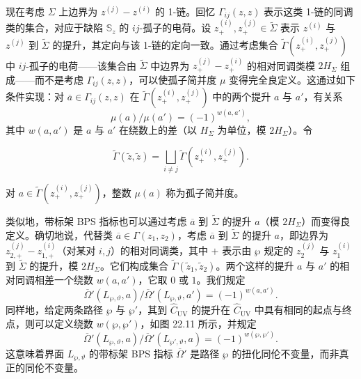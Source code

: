 现在考虑 $\Sigma$ 上边界为 $z^{(j)}-z^{(i)}$ 的 1-链。回忆 $\Gamma_{ij}(z,z)$ 表示这类 1-链的同调类的集合，对应于缺陷 $\mathbb{S}_z$ 的 $ij$-孤子的电荷。设 $z_+^{(i)},z_+^{(j)}\in\widetilde{\Sigma}$ 表示 $z^{(i)}$ 与 $z^{(j)}$ 到 $\widetilde{\Sigma}$ 的提升，其定向与该 1-链的定向一致。通过考虑集合 $\widetilde{\Gamma}(z_+^{(i)},z_+^{(j)})$ 中 $ij$-孤子的电荷——该集合由 $\widetilde{\Sigma}$ 中边界为 $z_+^{(j)}-z_+^{(i)}$ 的相对同调类模 $2H_\Sigma$ 组成——而不是考虑 $\Gamma_{ij}(z,z)$，可以使孤子简并度 $\mu$ 变得完全良定义。这通过如下条件实现：对 $\overline{a}\in\Gamma_{ij}(z,z)$ 在 $\widetilde{\Gamma}(z_+^{(i)},z_+^{(j)})$ 中的两个提升 $a$ 与 $a'$，有关系
\[
\mu(a)/\mu(a')=(-1)^{w(a,a')},
\]
其中 $w(a,a')$ 是 $a$ 与 $a'$ 在绕数上的差（以 $H_\Sigma$ 为单位，模 $2H_\Sigma$）。令

\[
\widetilde{\Gamma}(\widetilde{z},\widetilde{z})=\bigsqcup_{i\ne j}\widetilde{\Gamma}(z_+^{(i)},z_+^{(j)}).
\]

\begin{definition}[22.20]
对 $a\in\widetilde{\Gamma}(z_+^{(i)},z_+^{(j)})$，整数 $\mu(a)$ 称为孤子简并度。
\end{definition}

类似地，带标架 BPS 指标也可以通过考虑 $\overline{a}$ 到 $\widetilde{\Sigma}$ 的提升 $a$（模 $2H_\Sigma$）而变得良定义。确切地说，代替类 $\overline{a}\in\Gamma(z_1,z_2)$，考虑 $\overline{a}$ 到 $\widetilde{\Sigma}$ 的提升 $a$，即边界为 $z_{2,+}^{(j)}-z_{1,+}^{(i)}$（对某对 $i,j$）的相对同调类，其中 $+$ 表示由 $\wp$ 规定的 $z_2^{(j)}$ 与 $z_1^{(i)}$ 到 $\widetilde{\Sigma}$ 的提升，模 $2H_\Sigma$。它们构成集合 $\widetilde{\Gamma}(\widetilde{z}_1,\widetilde{z}_2)$。两个这样的提升 $a$ 与 $a'$ 的相对同调相差一个绕数 $w(a,a')$，它取 $0$ 或 $1$。我们规定
\[
\overline{\Omega}{}'(L_{\wp,\vartheta},a)/\overline{\Omega}{}'(L_{\wp,\vartheta},a')=(-1)^{w(a,a')}.
\]
同样地，给定两条路径 $\wp$ 与 $\wp'$，其到 $\widehat{C}_{\mathrm{UV}}$ 的提升在 $\widehat{C}_{\mathrm{UV}}$ 中具有相同的起点与终点，则可以定义绕数 $w(\wp,\wp')$，如图 22.11 所示，并规定
\[
\overline{\Omega}{}'(L_{\wp,\vartheta},a)/\overline{\Omega}{}'(L_{\wp',\vartheta},a)=(-1)^{w(\wp,\wp')}.
\]
这意味着界面 $L_{\wp,\vartheta}$ 的带标架 BPS 指标 $\overline{\Omega}{}'$ 是路径 $\wp$ 的扭化同伦不变量，而非真正的同伦不变量。


